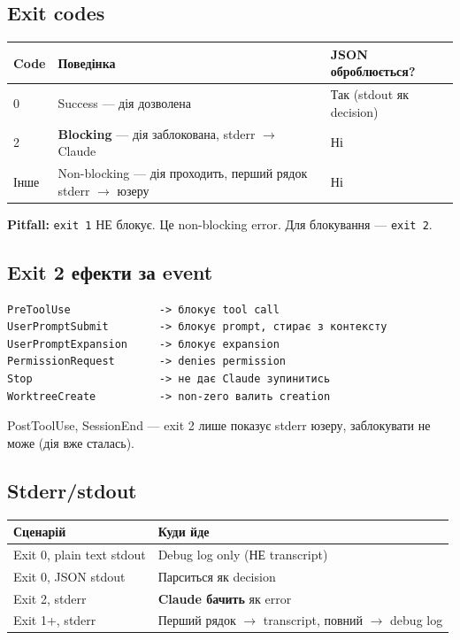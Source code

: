 \documentclass[11pt,a4paper]{article}
\begin{document}
\subsection{Exit codes}

\begin{tabular}{lll}
\hline
\textbf{Code} & \textbf{Поведінка} & \textbf{JSON оброблюється?} \\
\hline
0 & Success --- дія дозволена & Так (stdout як decision) \\
2 & \textbf{Blocking} --- дія заблокована, stderr $\to$ Claude & Ні \\
Інше & Non-blocking --- дія проходить, перший рядок stderr $\to$ юзеру & Ні \\
\hline
\end{tabular}

\textbf{Pitfall:} \texttt{exit 1} НЕ блокує. Це non-blocking error. Для блокування --- \texttt{exit 2}.

\subsection{Exit 2 ефекти за event}

\begin{lstlisting}
PreToolUse              -> блокує tool call
UserPromptSubmit        -> блокує prompt, стирає з контексту
UserPromptExpansion     -> блокує expansion
PermissionRequest       -> denies permission
Stop                    -> не дає Claude зупинитись
WorktreeCreate          -> non-zero валить creation
\end{lstlisting}

PostToolUse, SessionEnd --- exit 2 лише показує stderr юзеру, заблокувати не може (дія вже сталась).

\subsection{Stderr/stdout}

\begin{tabular}{ll}
\hline
\textbf{Сценарій} & \textbf{Куди йде} \\
\hline
Exit 0, plain text stdout & Debug log only (НЕ transcript) \\
Exit 0, JSON stdout & Парситься як decision \\
Exit 2, stderr & \textbf{Claude бачить} як error \\
Exit 1+, stderr & Перший рядок $\to$ transcript, повний $\to$ debug log \\
\hline
\end{tabular}
\end{document}
